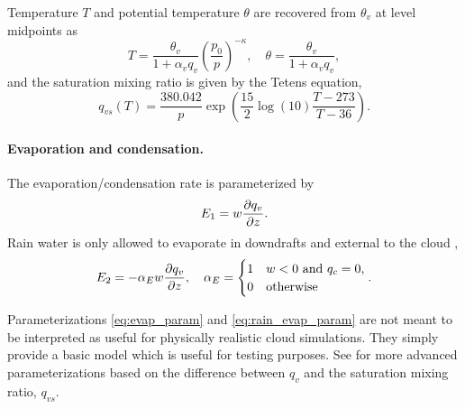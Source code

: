 Temperature $T$ and potential temperature $\theta$ are recovered from $\theta_v$ at level midpoints as
\begin{equation}\label{eq:temperature}
  T = \frac{\theta_v}{1+\alpha_v q_v} \left(\frac{p_0}{p}\right)^{-\kappa}, \quad \theta = \frac{\theta_v}{1+\alpha_vq_v},
\end{equation}
and the saturation mixing ratio is given by the Tetens equation,
\begin{equation}\label{eq:tetens}
  q_{vs}(T) = \frac{380.042}{p}\exp\left(\frac{15}{2}\log(10) \frac{T-273}{T-36}\right).
\end{equation}

\paragraph{Evaporation and condensation.}
The evaporation/condensation rate is parameterized by \cite[eqn.~(5)]{Srivastava1967}
\begin{equation}\label{eq:evap_param}
  E_1 = w\frac{\partial q_v }{\partial z}.
\end{equation}
Rain water is only allowed to evaporate in downdrafts and external to the cloud  \cite[eqn.~(10)]{Srivastava1967},
\begin{equation}\label{eq:rain_evap_param}
  E_2 = -\alpha_E w \frac{\partial q_v }{\partial z}, \quad \alpha_E = \begin{cases} 1 & w<0 \text{ and } q_c = 0,\\
 0 & \text{otherwise}  
 \end{cases}.
\end{equation}

\begin{rem}
Parameterizations \eqref{eq:evap_param} and \eqref{eq:rain_evap_param} are not meant to be interpreted as useful for physically realistic cloud simulations. 
They simply provide a basic model which is useful for testing purposes.
See \cite{SoongOgura1973,KlempWilhelmson1978} for more advanced parameterizations based on the difference between $q_v$ and the saturation mixing ratio, $q_{vs}$.
\end{rem}

